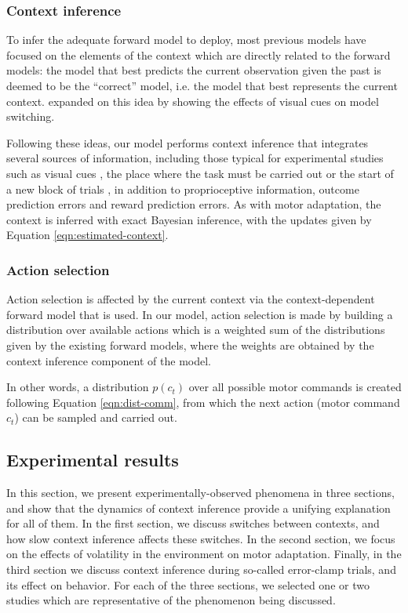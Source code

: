 \documentclass[a4paper,doc,floatsintext,natbib]{apa6}%
\def \eref #1{Equation \ref{#1}}   %
\begin{document}
\subsubsection{Context inference}
To infer the adequate forward model to deploy, most previous models \cite[e.g.][]{Wolpert_Multiple_1998,Imamizu_Neural_2008,Oh_Minimizing_2019} have focused on the elements of the context which are directly related to the forward models: the model that best predicts the current observation given the past is deemed to be the ``correct'' model, i.e. the model that best represents the current context. \cite{Imamizu_Explicit_2007} expanded on this idea by showing the effects of visual cues on model switching.

Following these ideas, our model performs context inference that integrates several sources of information, including those typical for experimental studies such as visual cues \citep{Lee_Dual_2009,Kim_Neural_2015}, the place where the task must be carried out \citep{Forano_Timescales_2020,Shadmehr_Adaptive_1994} or the start of a new block of trials \citep{Ethier_Spontaneous_2008}, in addition to proprioceptive information, outcome prediction errors and reward prediction errors. As with motor adaptation, the context is inferred with exact Bayesian inference, with the updates given by \eref{eqn:estimated-context}.

\subsubsection{Action selection}
Action selection is affected by the current context via the context-dependent forward model that is used. In our model, action selection is made by building a distribution over available actions which is a weighted sum of the distributions given by the existing forward models, where the weights are obtained by the context inference component of the model.

In other words, a distribution $p(c_t)$ over all possible motor commands is created following \eref{eqn:dist-comm}, from which the next action (motor command $c_t$) can be sampled and carried out.

\subsection{Experimental results}
In this section, we present experimentally-observed phenomena in three sections, and show that the dynamics of context inference provide a unifying explanation for all of them. In the first section, we discuss switches between contexts, and how slow context inference affects these switches. In the second section, we focus on the effects of volatility in the environment on motor adaptation. Finally, in the third section we discuss context inference during so-called error-clamp trials, and its effect on behavior. For each of the three sections, we selected one or two studies which are representative of the phenomenon being discussed.
\end{document}
